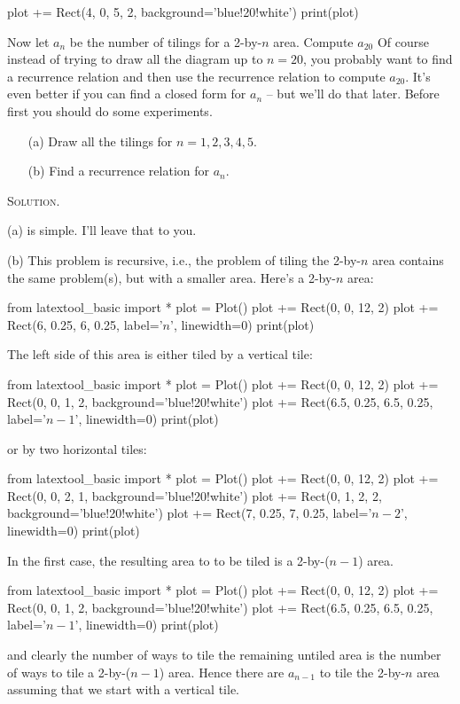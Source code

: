 \begin{eg}
\begin{python}
plot += Rect(4, 0, 5, 2, background='blue!20!white')
print(plot)
\end{python}
Now let $a_n$ be the number of tilings
for a 2-by-$n$ area.
Compute $a_{20}$
Of course instead of trying to draw all the diagram up to $n = 20$,
you probably want to find a recurrence relation and then use the
recurrence relation to compute $a_{20}$.
It's even better if you can find a closed form for $a_n$ -- but
we'll do that later.
Before first you should do some experiments.
\begin{enumerate}[nosep]
  \item[(a)] Draw all the tilings for $n=1, 2, 3, 4, 5$.
  \item[(b)] Find a recurrence relation for $a_n$.
\end{enumerate}
\end{eg}

\textsc{Solution.}

(a) is simple. I'll leave that to you.

(b)
This problem is recursive, i.e., the problem of
tiling the 2-by-$n$ area contains the same problem(s), but with a
smaller area.
Here's a 2-by-$n$ area:
\begin{python}
from latextool_basic import *
plot = Plot()
plot += Rect(0, 0, 12, 2)
plot += Rect(6, 0.25, 6, 0.25, label='$n$', linewidth=0)
print(plot)
\end{python}

The left side of this area is either tiled by a vertical tile:
\begin{python}
from latextool_basic import *
plot = Plot()
plot += Rect(0, 0, 12, 2)
plot += Rect(0, 0, 1, 2, background='blue!20!white')
plot += Rect(6.5, 0.25, 6.5, 0.25, label='$n - 1$', linewidth=0)
print(plot)
\end{python}
or by two horizontal tiles:
\begin{python}
from latextool_basic import *
plot = Plot()
plot += Rect(0, 0, 12, 2)
plot += Rect(0, 0, 2, 1, background='blue!20!white')
plot += Rect(0, 1, 2, 2, background='blue!20!white')
plot += Rect(7, 0.25, 7, 0.25, label='$n - 2$', linewidth=0)
print(plot)
\end{python}

In the first case, the resulting area to to be tiled is a 2-by-($n-1$) area.
\begin{python}
from latextool_basic import *
plot = Plot()
plot += Rect(0, 0, 12, 2)
plot += Rect(0, 0, 1, 2, background='blue!20!white')
plot += Rect(6.5, 0.25, 6.5, 0.25, label='$n - 1$', linewidth=0)
print(plot)
\end{python}
and clearly the number of ways to tile the remaining untiled area
is the number of ways to tile a 2-by-($n-1$) area.
Hence there are $a_{n-1}$ to tile the 2-by-$n$ area assuming that we
start with a vertical tile.

